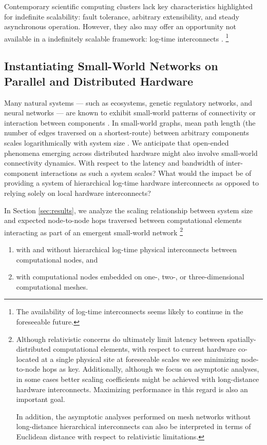 Contemporary scientific computing clusters lack key characteristics highlighted for indefinite scalability: fault tolerance, arbitrary extensibility, and steady asynchronous operation. %
However, they also may offer an opportunity not available in a indefinitely scalable framework: log-time interconnects \citep{mollah2018comparative}.
\footnote{
The availability of log-time interconnects seems likely to continue in the foreseeable future.
}

\subsection{Instantiating Small-World Networks on Parallel and Distributed Hardware}

Many natural systems --- such as ecosystems, genetic regulatory networks, and neural networks --- are known to exhibit small-world patterns of connectivity or interaction between components \citep{bassett2017small, fox2014herbivores, gaiteri2014beyond}.
In small-world graphs, mean path length (the number of edges traversed on a shortest-route) between arbitrary components scales logarithmically with system size \citep{watts1998collective}.
We anticipate that open-ended phenomena emerging across distributed hardware might also involve small-world connectivity dynamics.
With respect to the latency and bandwidth of inter-component interactions as such a system scales?
What would the impact be of providing a system of hierarchical log-time hardware interconnects as opposed to relying solely on local hardware interconnects?

In Section \ref{sec:results}, we analyze the scaling relationship between system size and expected node-to-node hops traversed between computational elements interacting as part of an emergent small-world network
\footnote{
Although relativistic concerns do ultimately limit latency between spatially-distributed computational elements, with respect to current hardware co-located at a single physical site at foreseeable scales we see minimizing node-to-node hops as key.
Additionally, although we focus on asymptotic analyses, in some cases better scaling coefficients might be achieved with long-distance hardware interconnects.
Maximizing performance in this regard is also an important goal.

In addition, the asymptotic analyses performed on mesh networks without long-distance hierarchical interconnects can also be interpreted in terms of Euclidean distance with respect to relativistic limitations.
}
\begin{enumerate}
\item with and without hierarchical log-time physical interconnects between computational nodes, and
\item with computational nodes embedded on one-, two-, or three-dimensional computational meshes.
\end{enumerate}

